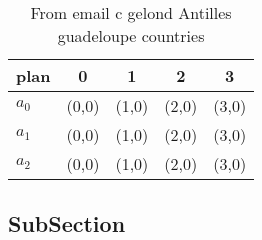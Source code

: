 \documentclass[a4paper]{article}
\begin{document}
\begin{table}
\begin{adjustbox}{width=0.6\columnwidth}
\begin{tabular}{|l|l|l|l|l|}
\hline
\textbf{plan} & \multicolumn{1}{c|}{\textbf{0}} & \multicolumn{1}{c|}{\textbf{1}} & \multicolumn{1}{c|}{\textbf{2}} & \multicolumn{1}{c|}{\textbf{3}} \\ \hline
\textbf{$a_0$}  & (0,0) & (1,0) & (2,0) & (3,0) \\ \hline
\textbf{$a_1$}  & (0,0) & (1,0) & (2,0) & (3,0) \\ \hline
\textbf{$a_2$}  & (0,0) & (1,0) & (2,0) & (3,0) \\ \hline
\end{tabular}
\end{adjustbox}
\caption{From email c gelond Antilles guadeloupe countries
}
\end{table}

\subsection{SubSection}
\end{document}
